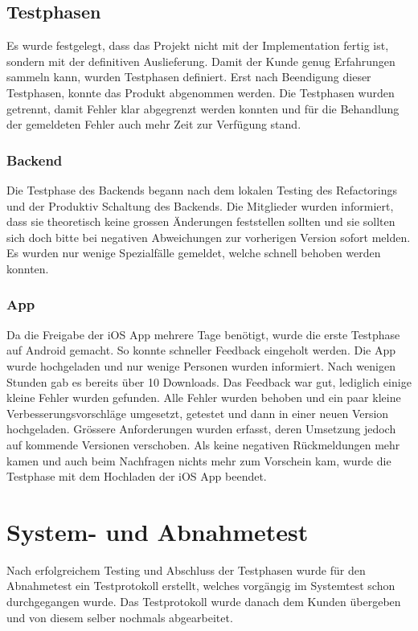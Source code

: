 \subsection{Testphasen}
Es wurde festgelegt, dass das Projekt nicht mit der Implementation fertig ist, sondern mit der definitiven Auslieferung. Damit der Kunde genug Erfahrungen sammeln kann, wurden Testphasen definiert. Erst nach Beendigung dieser Testphasen, konnte das Produkt abgenommen werden. Die Testphasen wurden getrennt, damit Fehler klar abgegrenzt werden konnten und für die Behandlung der gemeldeten Fehler auch mehr Zeit zur Verfügung stand.

\subsubsection{Backend}
Die Testphase des Backends begann nach dem lokalen Testing des Refactorings und der Produktiv Schaltung des Backends. Die Mitglieder wurden informiert, dass sie theoretisch keine grossen Änderungen feststellen sollten und sie sollten sich doch bitte bei negativen Abweichungen zur vorherigen Version sofort melden. Es wurden nur wenige Spezialfälle gemeldet, welche schnell behoben werden konnten.

\subsubsection{App}
Da die Freigabe der iOS App mehrere Tage benötigt, wurde die erste Testphase auf Android gemacht. So konnte schneller Feedback eingeholt werden. Die App wurde hochgeladen und nur wenige Personen wurden informiert. Nach wenigen Stunden gab es bereits über 10 Downloads. Das Feedback war gut, lediglich einige kleine Fehler wurden gefunden. Alle Fehler wurden behoben und ein paar kleine Verbesserungsvorschläge umgesetzt, getestet und dann in einer neuen Version hochgeladen. Grössere Anforderungen wurden erfasst, deren Umsetzung jedoch auf kommende Versionen verschoben. Als keine negativen Rückmeldungen mehr kamen und auch beim Nachfragen nichts mehr zum Vorschein kam, wurde die Testphase mit dem Hochladen der iOS App beendet.

\section{System- und Abnahmetest}
Nach erfolgreichem Testing und Abschluss der Testphasen wurde für den Abnahmetest ein Testprotokoll erstellt, welches vorgängig im Systemtest schon durchgegangen wurde. Das Testprotokoll wurde danach dem Kunden übergeben und von diesem selber nochmals abgearbeitet.

